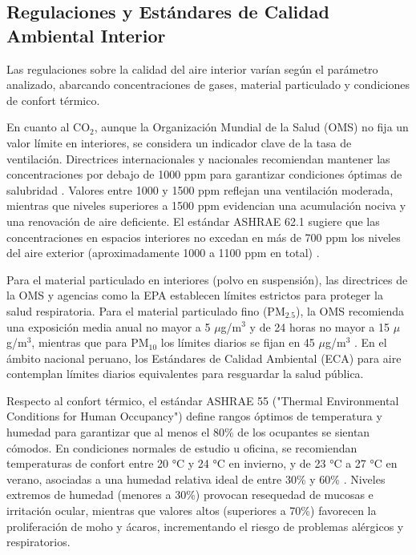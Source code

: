 \subsection{Regulaciones y Estándares de Calidad Ambiental Interior}
Las regulaciones sobre la calidad del aire interior varían según el parámetro analizado, abarcando concentraciones de gases, material particulado y condiciones de confort térmico.

En cuanto al CO\(_2\), aunque la Organización Mundial de la Salud (OMS) no fija un valor límite en interiores, se considera un indicador clave de la tasa de ventilación. Directrices internacionales y nacionales recomiendan mantener las concentraciones por debajo de 1000 ppm para garantizar condiciones óptimas de salubridad \cite{indoor_air_quality_guidelines_from_across_the_world_an_appraisal_considering_energy_saving_health_productivity_and_comfort, ISIAQ_database}. Valores entre 1000 y 1500 ppm reflejan una ventilación moderada, mientras que niveles superiores a 1500 ppm evidencian una acumulación nociva y una renovación de aire deficiente. El estándar ASHRAE 62.1 sugiere que las concentraciones en espacios interiores no excedan en más de 700 ppm los niveles del aire exterior (aproximadamente 1000 a 1100 ppm en total) \cite{A_Systematic_Review_of_Air_Quality_Sensors_Guidelines_and_Measurement_Studies_for_Indoor_Air_Quality_Management}.

Para el material particulado en interiores (polvo en suspensión), las directrices de la OMS y agencias como la EPA establecen límites estrictos para proteger la salud respiratoria. Para el material particulado fino (PM\(_{2.5}\)), la OMS recomienda una exposición media anual no mayor a 5 \(\mu\)g/m\(^3\) y de 24 horas no mayor a 15 \(\mu\)g/m\(^3\), mientras que para PM\(_{10}\) los límites diarios se fijan en 45 \(\mu\)g/m\(^3\) \cite{who_air_quality_guidelines_2021}. En el ámbito nacional peruano, los Estándares de Calidad Ambiental (ECA) para aire contemplan límites diarios equivalentes para resguardar la salud pública.

Respecto al confort térmico, el estándar ASHRAE 55 ("Thermal Environmental Conditions for Human Occupancy") define rangos óptimos de temperatura y humedad para garantizar que al menos el 80\% de los ocupantes se sientan cómodos. En condiciones normales de estudio u oficina, se recomiendan temperaturas de confort entre 20 °C y 24 °C en invierno, y de 23 °C a 27 °C en verano, asociadas a una humedad relativa ideal de entre 30\% y 60\% \cite{ashrae_55_standard}. Niveles extremos de humedad (menores a 30\%) provocan resequedad de mucosas e irritación ocular, mientras que valores altos (superiores a 70\%) favorecen la proliferación de moho y ácaros, incrementando el riesgo de problemas alérgicos y respiratorios.

